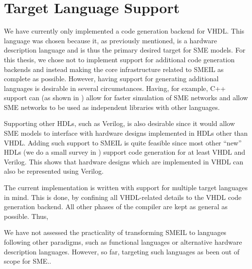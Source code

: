 \section{Target Language Support}
We have currently only implemented a code generation backend for VHDL. This
language was chosen because it, as previously mentioned, is a hardware
description language and is thus the primary desired target for SME models. For
this thesis, we chose not to implement support for additional code generation
backends and instead making the core infrastructure related to SMEIL as complete
as possible. However, having support for generating additional languages is
desirable in several circumstances. Having, for example, C++ support can (as
shown in \cite{skovhede2017c++}) allow for faster simulation of SME networks and
allow SME networks to be used as independent libraries with other languages.

Supporting other HDLs, such as Verilog, is also desirable since it would allow
SME models to interface with hardware designs implemented in HDLs other than
VHDL. Adding such support to SMEIL is quite feasible since most other ``new''
HDLs (we do a small survey in ) support code generation for at
least VHDL and Verilog. This shows that hardware designs which are implemented
in VHDL can also be represented using Verilog.

The current \libsme{} implementation is written with support for multiple target
languages in mind. This is done, by confining all VHDL-related details to the
VHDL code generation backend. All other phases of the compiler are kept as
general as possible. Thus, 

We have not assessed the practicality of transforming SMEIL to languages
following other paradigms, such as functional languages or alternative hardware
description languages. However, so far, targeting such languages as been out of
scope for SME..



